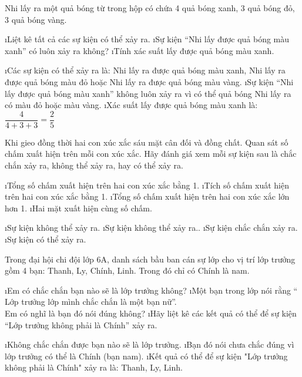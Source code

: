 \begin{bt}
	Nhi lấy ra một quả bóng từ trong hộp có chứa 4 quả bóng xanh, 3 quả bóng đỏ, 3 quả bóng vàng.
	\begin{enumerate}[a),leftmargin=*]
		\i Liệt kê tất cả các sự kiện có thể xảy ra.
		\i Sự kiện “Nhi lấy được quả bóng màu xanh” có luôn xảy ra không?
		\i Tính xác suất lấy được quả bóng màu xanh.
	\end{enumerate}
	\begin{loigiaichuong41}
		\begin{enumerate}[a),leftmargin=*]
			\i Các sự kiện có thể xảy ra là: Nhi lấy ra được quả bóng màu xanh, Nhi lấy ra được quả bóng màu đỏ hoặc Nhi lấy ra được quả bóng màu vàng.
			\i Sự kiện “Nhi lấy được quả bóng màu xanh” không luôn xảy ra vì có thể quả bóng Nhi lấy ra có màu đỏ hoặc màu vàng.
			\i Xác suất lấy được quả bóng màu xanh là: $\dfrac{4}{{4 + 3 + 3}} = \dfrac{2}{5}$
		\end{enumerate}
	\end{loigiaichuong41}
\end{bt}
\begin{bt}
	Khi gieo đồng thời hai con xúc xắc sáu mặt cân đối và đồng chất. Quan sát số chấm xuất hiện trên mỗi con xúc xắc. Hãy đánh giá xem mỗi sự kiện sau là chắc chắn xảy ra, không thể xảy ra, hay có thể xảy ra.
	\begin{enumerate}[a),leftmargin=*]
		\i Tổng số chấm xuất hiện trên hai con xúc xắc bằng 1.
		\i Tích số chấm xuất hiện trên hai con xúc xắc bằng 1.
		\i Tổng số chấm xuất hiện trên hai con xúc xắc lớn hơn 1.
		\i Hai mặt xuất hiện cùng số chấm.
	\end{enumerate}
	\begin{loigiaichuong41}
		\begin{enumerate}[a),leftmargin=*]
			\i Sự kiện không thể xảy ra.
			\i Sự kiện không thể xảy ra..
			\i Sự kiện chắc chắn xảy ra.
			\i Sự kiện có thể xảy ra.
		\end{enumerate}
	\end{loigiaichuong41}
\end{bt}
\begin{bt}
	Trong đại hội chi đội lớp 6A, danh sách bầu ban cán sự lớp cho vị trí lớp trưởng gồm 4 bạn: Thanh, Ly, Chính, Linh.
	Trong đó chỉ có Chính là nam.
	\begin{enumerate}[a),leftmargin=*]
		\i Em có chắc chắn bạn nào sẽ là lớp trưởng không?
		\i Một bạn trong lớp nói rằng “ Lớp trưởng lớp mình chắc chắn là một bạn nữ”.\\
		Em có nghĩ là bạn đó nói đúng không?
		\i Hãy liệt kê các kết quả có thể để sự kiện “Lớp trưởng không phải là Chính” xảy ra.
	\end{enumerate}
	\begin{loigiaichuong41}
		\begin{enumerate}[a),leftmargin=*]
			\i Không chắc chắn được bạn nào sẽ là lớp trưởng.
			\i Bạn đó nói chưa chắc đúng vì lớp trưởng có thể là Chính (bạn nam).
			\i Kết quả có thể để sự kiện "Lớp trưởng không phải là Chính" xảy ra là: Thanh, Ly, Linh.
		\end{enumerate}
	\end{loigiaichuong41}
\end{bt}
